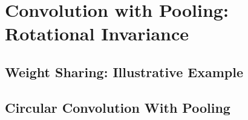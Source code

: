\section{Convolution with Pooling: Rotational Invariance}

\subsection{Weight Sharing: Illustrative Example}
\FloatBarrier
\begin{figure}[h]
\centering
{}
\end{figure}

\subsection{Circular Convolution With Pooling}

